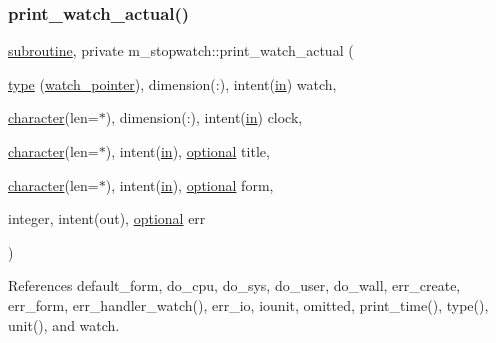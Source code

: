 \subsubsection{\texorpdfstring{print\+\_\+watch\+\_\+actual()}{print\_watch\_actual()}}
{\footnotesize\ttfamily \hyperlink{M__stopwatch_83_8txt_acfbcff50169d691ff02d4a123ed70482}{subroutine}, private m\+\_\+stopwatch\+::print\+\_\+watch\+\_\+actual (\begin{DoxyParamCaption}\item[{\hyperlink{stop__watch_83_8txt_a70f0ead91c32e25323c03265aa302c1c}{type} (\hyperlink{structm__stopwatch_1_1watch__pointer}{watch\+\_\+pointer}), dimension(\+:), intent(\hyperlink{M__journal_83_8txt_afce72651d1eed785a2132bee863b2f38}{in})}]{watch,  }\item[{\hyperlink{option__stopwatch_83_8txt_abd4b21fbbd175834027b5224bfe97e66}{character}(len=$\ast$), dimension(\+:), intent(\hyperlink{M__journal_83_8txt_afce72651d1eed785a2132bee863b2f38}{in})}]{clock,  }\item[{\hyperlink{option__stopwatch_83_8txt_abd4b21fbbd175834027b5224bfe97e66}{character}(len=$\ast$), intent(\hyperlink{M__journal_83_8txt_afce72651d1eed785a2132bee863b2f38}{in}), \hyperlink{option__stopwatch_83_8txt_aa4ece75e7acf58a4843f70fe18c3ade5}{optional}}]{title,  }\item[{\hyperlink{option__stopwatch_83_8txt_abd4b21fbbd175834027b5224bfe97e66}{character}(len=$\ast$), intent(\hyperlink{M__journal_83_8txt_afce72651d1eed785a2132bee863b2f38}{in}), \hyperlink{option__stopwatch_83_8txt_aa4ece75e7acf58a4843f70fe18c3ade5}{optional}}]{form,  }\item[{integer, intent(out), \hyperlink{option__stopwatch_83_8txt_aa4ece75e7acf58a4843f70fe18c3ade5}{optional}}]{err }\end{DoxyParamCaption})\hspace{0.3cm}{\ttfamily [private]}}



References default\+\_\+form, do\+\_\+cpu, do\+\_\+sys, do\+\_\+user, do\+\_\+wall, err\+\_\+create, err\+\_\+form, err\+\_\+handler\+\_\+watch(), err\+\_\+io, iounit, omitted, print\+\_\+time(), type(), unit(), and watch.

